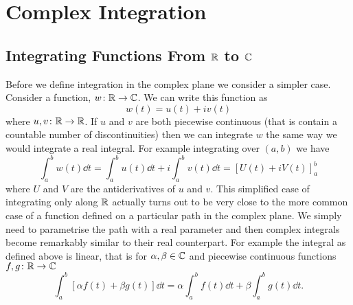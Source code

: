 \documentclass{article}
\begin{document}
    \section{Complex Integration}
    \subsection{Integrating Functions From \texorpdfstring{\(\mathbb{R}\)}{R} to \texorpdfstring{\(\mathbb{C}\)}{C}}
    Before we define integration in the complex plane we consider a simpler case.
    Consider a function, \(w\colon\mathbb{R}\to\mathbb{C}\).
    We can write this function as
    \[w(t) = u(t) + iv(t)\]
    where \(u, v\colon\mathbb{R}\to\mathbb{R}\).
    If \(u\) and \(v\) are both piecewise continuous (that is contain a countable number of discontinuities) then we can integrate \(w\) the same way we would integrate a real integral.
    For example integrating over \((a, b)\) we have
    \[\int_a^b w(t) \dd{t} = \int_a^b u(t)\dd{t} + i\int_a^b v(t) \dd{t} = [U(t) + iV(t)]_a^b\]
    where \(U\) and \(V\) are the antiderivatives of \(u\) and \(v\).
    This simplified case of integrating only along \(\mathbb{R}\) actually turns out to be very close to the more common case of a function defined on a particular path in the complex plane.
    We simply need to parametrise the path with a real parameter and then complex integrals become remarkably similar to their real counterpart.
    For example the integral as defined above is linear, that is for \(\alpha, \beta\in\mathbb{C}\) and piecewise continuous functions \(f, g\colon\mathbb{R}\to\mathbb{C}\)
    \[\int_a^b [\alpha f(t) + \beta g(t)] \dd{t} = \alpha \int_a^b f(t) \dd{t} + \beta \int_a^b g(t) \dd{t}.\]
    
\end{document}
